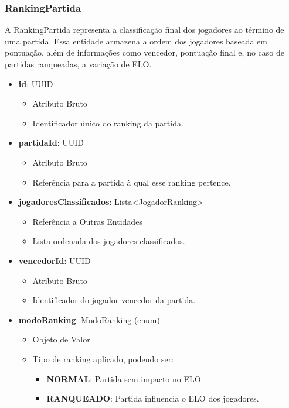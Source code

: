     \subsubsection{RankingPartida}
    A RankingPartida representa a classificação final dos jogadores ao término de uma partida. Essa entidade armazena a ordem dos jogadores baseada em pontuação, além de informações como vencedor, pontuação final e, no caso de partidas ranqueadas, a variação de ELO.    
    \begin{itemize}
        \item \textbf{id}: UUID  
              \begin{itemize}
                  \item Atributo Bruto
                  \item Identificador único do ranking da partida.
              \end{itemize}
    
        \item \textbf{partidaId}: UUID  
              \begin{itemize}
                  \item Atributo Bruto
                  \item Referência para a partida à qual esse ranking pertence.
              \end{itemize}
    
        \item \textbf{jogadoresClassificados}: Lista\textless JogadorRanking\textgreater  
              \begin{itemize}
                  \item Referência a Outras Entidades
                  \item Lista ordenada dos jogadores classificados.
              \end{itemize}
    
        \item \textbf{vencedorId}: UUID  
              \begin{itemize}
                  \item Atributo Bruto
                  \item Identificador do jogador vencedor da partida.
              \end{itemize}
    
        \item \textbf{modoRanking}: ModoRanking (enum)  
              \begin{itemize}
                  \item Objeto de Valor
                  \item Tipo de ranking aplicado, podendo ser:
                  \begin{itemize}
                      \item \textbf{NORMAL}: Partida sem impacto no ELO.
                      \item \textbf{RANQUEADO}: Partida influencia o ELO dos jogadores.
                  \end{itemize}
              \end{itemize}
    

\end{itemize}
